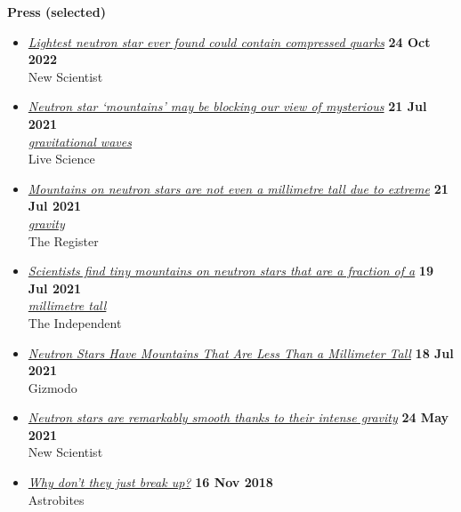 \begin{resume}
\textbf{Press (selected)}
%
\vspace*{0.05in}
\begin{itemize}
    \item[]
    \href{https://www.newscientist.com/article/2343788-lightest-neutron-star-ever-found-could-contain-compressed-quarks/}%
    {\textit{Lightest neutron star ever found could contain compressed quarks}}
    \hfill \textbf{24 Oct 2022} \\
    New Scientist
    \item[]
    \href{https://www.livescience.com/millimeter-tall-neutron-star-mountains.html}%
    {\textit{Neutron star `mountains' may be blocking our view of mysterious}}
    \hfill \textbf{21 Jul 2021} \\
    \href{https://www.livescience.com/millimeter-tall-neutron-star-mountains.html}%
    {\textit{gravitational waves}} \\
    Live Science
    \item[]
    \href{https://www.theregister.com/2021/07/21/mountain_neutron_stars/}%
    {\textit{Mountains on neutron stars are not even a millimetre tall due to extreme}}
    \hfill \textbf{21 Jul 2021} \\
    \href{https://www.theregister.com/2021/07/21/mountain_neutron_stars/}%
    {\textit{gravity}} \\
    The Register
    \item[]
    \href{https://www.independent.co.uk/space/neutron-stars-mountains-ligo-virgo-b1886426.html}%
    {\textit{Scientists find tiny mountains on neutron stars that are a fraction of a}}
    \hfill \textbf{19 Jul 2021} \\
    \href{https://www.independent.co.uk/space/neutron-stars-mountains-ligo-virgo-b1886426.html}%
    {\textit{millimetre tall}} \\
    The Independent
    \item[]
    \href{https://gizmodo.com/neutron-stars-have-mountains-that-are-less-than-a-milli-1847309049}%
    {\textit{Neutron Stars Have Mountains That Are Less Than a Millimeter Tall}}
    \hfill \textbf{18 Jul 2021} \\
    Gizmodo
    \item[]
    \href{https://www.newscientist.com/article/2278363-neutron-stars-are-remarkably-smooth-thanks-to-their-intense-gravity/}%
    {\textit{Neutron stars are remarkably smooth thanks to their intense gravity}}
    \hfill \textbf{24 May 2021} \\
    New Scientist
    \item[]
    \href{https://astrobites.org/2018/11/16/ns_breakup/}%
    {\textit{Why don't they just break up?}}
    \hfill \textbf{16 Nov 2018} \\
    Astrobites
\end{itemize}


\end{resume}
